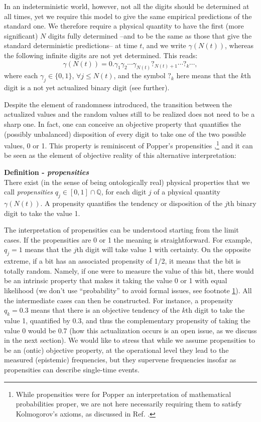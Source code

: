 \documentclass[12pt]{article}
\newcommand{\Q}{\mathbb{Q}}
\begin{document}
In an indeterministic world, however, not all the digits should be determined at all times, yet we require this model to give the same empirical predictions of the standard one. We therefore require a physical quantity to have the first (more significant) $N$ digits fully determined --and to be the same as those that give the standard deterministic predictions-- at time $t$, and we write $\gamma(N(t))$, whereas the following infinite digits are not yet determined. This reads:
%
\begin{equation*}
\gamma \left(N(t)\right)=0.\gamma_1\gamma_2\cdots \gamma_{N(t)} ?_{N(t)+1}\cdots ?_k\cdots,
\end{equation*}
%
where each $\gamma_j\in\{0,1\}$, $\forall j\leq N(t)$, and the symbol $?_k$ here means that the $k$th digit is a not yet actualized binary digit (see further).

Despite the element of randomness introduced, the transition between the actualized values and the random values still to be realized does not need to be a sharp one. In fact, one can conceive an objective property that quantifies the (possibly unbalanced) disposition of every digit to take one of the two possible values, 0 or 1. This property is reminiscent of Popper's propensities \cite{popper},\footnote{\label{note}While propensities were for Popper an interpretation of mathematical probabilities proper, we are not here necessarily requiring them to satisfy Kolmogorov's axioms, as discussed in Ref. \cite{gisin2}.} and it can be seen as the element of objective reality of this alternative interpretation:


\textbf{Definition - \textit{propensities}}\\
There exist (in the sense of  being ontologically real) physical properties that we call \emph{propensities} $q_j\in [0,1] \cap \Q$, for each digit $j$ of a physical quantity $\gamma(N(t))$. A propensity quantifies the tendency or disposition of the $j$th binary digit to take the value 1.

{The interpretation of propensities can be understood starting from the limit cases. If the propensities are 0 or 1 the meaning is straightforward. For example, $q_j=1$ means that the $j$th digit will take value 1 with certainty. On the opposite extreme, if a bit has an associated propensity of 1/2, it means that the bit is totally random. Namely, if one were to measure the value of this bit, there would be an intrinsic property that makes it taking the value 0 or 1 with equal likelihood (we don't use ``probability'' to avoid formal issues, see footnote \ref{note}). All the intermediate cases can then be constructed. For instance, a propensity $q_k=0.3$ means that there is an objective tendency of the $k$th digit to take the value 1, quantified by 0.3, and thus the complementary propensity of taking the value 0 would be 0.7 (how this actualization occurs is an open issue, as we discuss in the next section). We would like to stress that while we assume propensities to be an (ontic) objective property, at the operational level they lead to the measured (epistemic) frequencies, but they supervene frequencies insofar as propensities can describe single-time events.}
\end{document}
